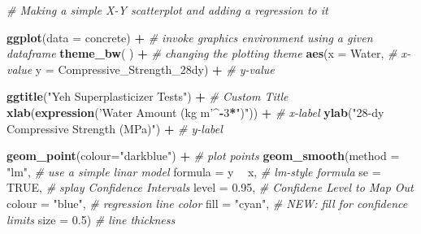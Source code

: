 \documentclass[]{article}
\newenvironment{Shaded}{\begin{snugshade}}{\end{snugshade}}
\newcommand{\CommentTok}[1]{\textcolor[rgb]{0.56,0.35,0.01}{\textit{#1}}}
\newcommand{\DataTypeTok}[1]{\textcolor[rgb]{0.13,0.29,0.53}{#1}}
\newcommand{\DecValTok}[1]{\textcolor[rgb]{0.00,0.00,0.81}{#1}}
\newcommand{\FloatTok}[1]{\textcolor[rgb]{0.00,0.00,0.81}{#1}}
\newcommand{\KeywordTok}[1]{\textcolor[rgb]{0.13,0.29,0.53}{\textbf{#1}}}
\newcommand{\NormalTok}[1]{#1}
\newcommand{\OperatorTok}[1]{\textcolor[rgb]{0.81,0.36,0.00}{\textbf{#1}}}
\newcommand{\OtherTok}[1]{\textcolor[rgb]{0.56,0.35,0.01}{#1}}
\newcommand{\StringTok}[1]{\textcolor[rgb]{0.31,0.60,0.02}{#1}}
\begin{document}
\begin{Shaded}
\begin{Highlighting}[]
\CommentTok{# Making a simple X-Y scatterplot and adding a regression to it}

\KeywordTok{ggplot}\NormalTok{(}\DataTypeTok{data =}\NormalTok{ concrete) }\OperatorTok{+}\StringTok{                }\CommentTok{# invoke graphics environment using a given dataframe}
\StringTok{  }
\StringTok{  }\KeywordTok{theme_bw}\NormalTok{( ) }\OperatorTok{+}\StringTok{                           }\CommentTok{# changing the plotting theme}
\StringTok{  }
\StringTok{  }\KeywordTok{aes}\NormalTok{(}\DataTypeTok{x      =}\NormalTok{ Water,                      }\CommentTok{# x-value}
      \DataTypeTok{y      =}\NormalTok{ Compressive_Strength_28dy) }\OperatorTok{+}\StringTok{  }\CommentTok{# y-value}

\StringTok{  }\KeywordTok{ggtitle}\NormalTok{(}\StringTok{"Yeh Superplasticizer Tests"}\NormalTok{) }\OperatorTok{+}\StringTok{    }\CommentTok{# Custom Title}
\StringTok{  }
\StringTok{  }\KeywordTok{xlab}\NormalTok{(}\KeywordTok{expression}\NormalTok{(}\StringTok{'Water Amount (kg m'}\OperatorTok{^-}\DecValTok{3}\OperatorTok{*}\StringTok{")"}\NormalTok{)) }\OperatorTok{+}\StringTok{  }\CommentTok{# x-label}
\StringTok{  }\KeywordTok{ylab}\NormalTok{(}\StringTok{"28-dy Compressive Strength (MPa)"}\NormalTok{)      }\OperatorTok{+}\StringTok{   }\CommentTok{# y-label}

\StringTok{  }\KeywordTok{geom_point}\NormalTok{(}\DataTypeTok{colour=}\StringTok{"darkblue"}\NormalTok{) }\OperatorTok{+}\StringTok{  }\CommentTok{# plot points}
\StringTok{  }
\StringTok{  }\KeywordTok{geom_smooth}\NormalTok{(}\DataTypeTok{method  =} \StringTok{"lm"}\NormalTok{,    }\CommentTok{# use a simple linar model}
              \DataTypeTok{formula =}\NormalTok{ y }\OperatorTok{~}\StringTok{ }\NormalTok{x,   }\CommentTok{# lm-style formula}
              \DataTypeTok{se      =} \OtherTok{TRUE}\NormalTok{,    }\CommentTok{# splay Confidence Intervals}
              \DataTypeTok{level   =} \FloatTok{0.95}\NormalTok{,    }\CommentTok{# Confidene Level to Map Out}
              \DataTypeTok{colour  =} \StringTok{"blue"}\NormalTok{,  }\CommentTok{# regression line color}
              \DataTypeTok{fill    =} \StringTok{"cyan"}\NormalTok{,  }\CommentTok{# NEW: fill for confidence limits}
              \DataTypeTok{size    =} \FloatTok{0.5}\NormalTok{)     }\CommentTok{# line thickness}
\end{Highlighting}
\end{Shaded}
\end{document}
